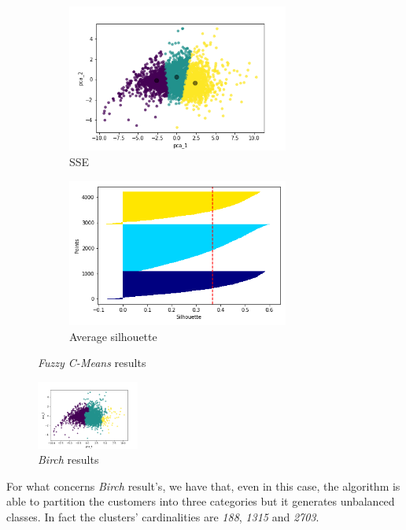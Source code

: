 \begin{figure}[h!]
     \captionsetup{justification=centering}		
     \centering
     \begin{subfigure}{0.39\textwidth}
         \centering
	 \captionsetup{type=figure}
         \includegraphics[width=0.8\textwidth]{img/clustering/clust_fcmeans.png}
         \caption{SSE}
         \label{fig:clust_fcmeans}
     \end{subfigure}
     \begin{subfigure}{0.39\textwidth}
         \centering
         \includegraphics[width=0.8\textwidth]{img/clustering/sil_fcmeans.png}
         \caption{Average silhouette}
         \label{fig:sil_fcmeans}
     \end{subfigure}
     \caption{\emph{Fuzzy C-Means} results}
    \label{fig:fc_means}
\end{figure}

\vspace{8mm}
\begin{figure}
	\vspace{-10mm}
	\centering
	\includegraphics[width=0.3\textwidth]{img/clustering/clust_birch.png}
	\caption{\emph{Birch} results}
	\label{fig:clust_birch}
\end{figure}
For what concerns \emph{Birch} result's, we have that, even in this case, the algorithm is able to partition the customers into three categories but it generates unbalanced classes. In fact the clusters' cardinalities are \emph{188}, \emph{1315} and \emph{2703}.

